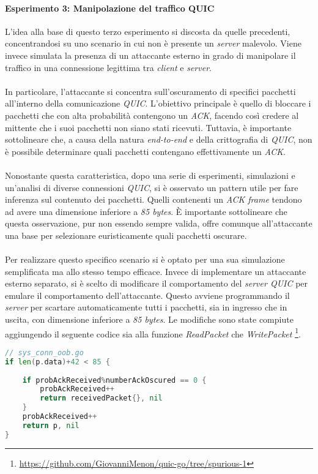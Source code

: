 \paragraph{Esperimento 3: Manipolazione del traffico QUIC }
\label{esperimento3}
\noindent L'idea alla base di questo terzo esperimento si discosta da quelle precedenti, concentrandosi su uno scenario in cui non è presente un \emph{server} malevolo.
Viene invece simulata la presenza di un attaccante esterno in grado di manipolare il traffico in una connessione legittima tra \emph{client} e \emph{server}.
\\\\
In particolare, l'attaccante si concentra sull'oscuramento di specifici pacchetti all'interno della comunicazione \emph{QUIC}. 
L'obiettivo principale è quello di bloccare i pacchetti che con alta probabilità contengono un \emph{ACK}, facendo così credere al mittente che i suoi pacchetti non siano stati ricevuti.
Tuttavia, è importante sottolineare che, a causa della natura \emph{end-to-end} e della crittografia di \emph{QUIC}, non è possibile determinare quali pacchetti contengano effettivamente un \emph{ACK}.
\\\\
Nonostante questa caratteristica, dopo una serie di esperimenti, simulazioni e un'analisi di diverse connessioni \emph{QUIC}, si è osservato un pattern utile per fare inferenza sul contenuto dei pacchetti. Quelli contenenti un \emph{ACK frame} tendono ad avere una dimensione inferiore a \emph{85 bytes}.
È importante sottolineare che questa osservazione, pur non essendo sempre valida, offre comunque all'attaccante una base per selezionare euristicamente quali pacchetti oscurare.
\\\\
Per realizzare questo specifico scenario si è optato per una sua simulazione semplificata ma allo stesso tempo efficace. 
Invece di implementare un attaccante esterno separato, si è scelto di modificare il comportamento del \emph{server QUIC} per emulare il comportamento dell'attaccante.
Questo avviene programmando il \emph{server} per scartare automaticamente tutti i pacchetti, sia in ingresso che in uscita, con dimensione inferiore a \emph{85 bytes}.
Le modifiche sono state compiute aggiungendo il seguente codice sia alla funzione \emph{ReadPacket} che \emph{WritePacket} \footnote{\url{https://github.com/GiovanniMenon/quic-go/tree/spurious-1}}.
\begin{lstlisting}[language=Go]
// sys_conn_oob.go
if len(p.data)+42 < 85 {
	
	if probAckReceived%numberAckOscured == 0 {
		probAckReceived++
		return receivedPacket{}, nil
	}
	probAckReceived++
	return p, nil
}
\end{lstlisting}

